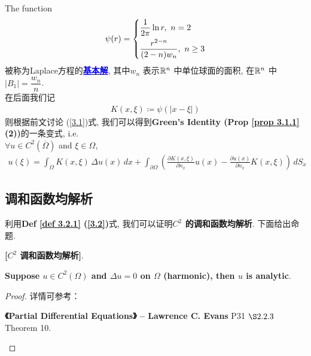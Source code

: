 	\begin{defn}\label{def 3.2.1}
		The function
		\begin{align*}
			\psi(r) = 
			\begin{dcases*}
				\frac{1}{2\pi} \ln r , \,\, n = 2 \\
				\frac{r^{2 - n}}{(2 - n) w_n} , \,\, n \geq 3
			\end{dcases*}
		\end{align*}
		被称为Laplace方程的\underline{\textcolor{blue}{\textbf{基本解}}}, 其中$w_n$ 表示$\mathbb{R}^n$ 中单位球面的面积, 在$\mathbb{R}^n$ 中$| B_1 | = \dfrac{w_n}{n}$. \\
		在后面我们记
		\begin{align*}
			K(x , \xi) \coloneqq \psi(| x - \xi |)
		\end{align*}
		则根据前文讨论 (\ref{3.1})式, 我们可以得到\textbf{Green's Identity (Prop \ref{prop 3.1.1} (2))}的一条变式, i.e.\\
		$\forall u \in C^2\left( \overline{\Omega} \right)$ and $\xi \in \Omega$, 
		\begin{align}
			u(\xi) 
			= \int_{\Omega} K(x , \xi) \, \Delta u(x) \, dx 
			+ \int_{\partial \Omega} \left( \frac{\partial K(x , \xi)}{\partial n_x} u(x) - \frac{\partial u(x)}{\partial n_x} K(x , \xi) \right) \, dS_x \label{3.2}
		\end{align}
	\end{defn}
	
\newpage

\subsection{调和函数均解析}
	利用\textbf{Def \ref{def 3.2.1} (\ref{3.2})}式, 我们可以证明\textbf{$C^2$ 的调和函数均解析}. 下面给出命题. 
	
	\vspace*{1em}
	
	\begin{proposition}\label{prop 3.2.1}
		\textbf{[$C^2$ 调和函数均解析]}. 
		\begin{center}
			\textbf{Suppose $u \in C^2(\Omega)$ and $\Delta u = 0$ on $\Omega$ (harmonic), then $u$ is analytic}. 
		\end{center}
		
		\vspace*{4em}
		
		\begin{proof}
			详情可参考：
			\begin{center}
				\textbf{《Partial Differential Equations》 -- Lawrence C. Evans} P31 $\S 2.2.3$ Theorem 10.
			\end{center}
		\end{proof}
	\end{proposition}

